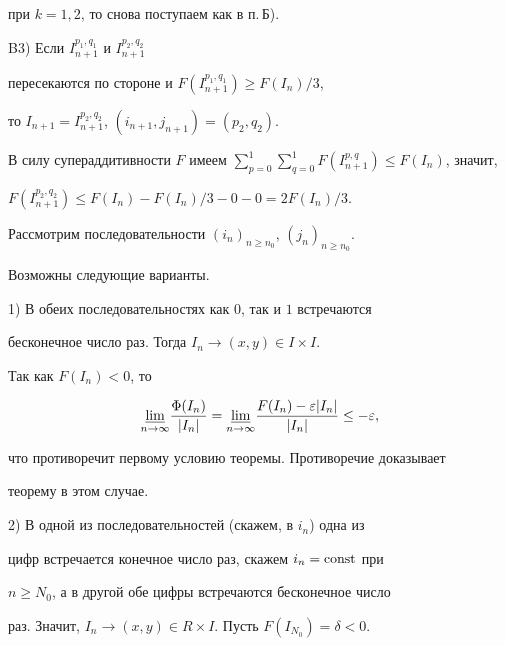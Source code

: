 \begin{pf}
при $k=1,2$, то снова поступаем как в п.\,Б).





B3) Если $I^{p_{1},q_{1}}_{n+1}$ и $I^{p_{2},q_{2}}_{n+1}$


пересекаются по стороне и $F(I^{p_{1},q_{1}}_{n+1})\ge F(I_{n})/3$,


то $I_{n+1}=I^{p_{2},q_{2}}_{n+1}$, $(i_{n+1},j_{n+1})=(p_{2},q_{2})$.


В силу супераддитивности $F$ имеем $\sum\limits _{p=0}^{1}\sum\limits _{q=0}


^{1}F(I^{p,q}_{n+1})\le F(I_{n})$, значит,


$F(I^{p_{2},q_{2}}_{n+1})\leq F(I_{n})


-F(I_{n})/3-0-0=2F(I_{n})/3$.





Рассмотрим последовательности $(i_{n})_{n\ge n_{0}}$, $(j_{n})_{n\ge n_{0}}$.


Возможны следующие варианты.





1) В обеих последовательностях как $0$, так и $1$ встречаются


бесконечное число раз. Тогда $I_{n}\rightarrow (x,y)\in I\times I$.


Так как $F(I_{n})<0$, то 


$$


\underset{n \to \infty}{\varliminf}{}


\frac{\Phi(I_{n})}


{| I_{n}| }=\underset{n \to \infty}{\varliminf}{}


\frac{F(I_{n})-\varepsilon | I_{n}| }{| I_{n}| }\le -\varepsilon ,


$$


что противоречит первому условию теоремы. Противоречие доказывает


теорему в этом случае.





2) В одной из последовательностей (скажем, в $i_{n}$) одна из


цифр встречается конечное число раз, скажем $i_{n}=\operatorname{const}$ при


$n\ge N_{0}$, а в другой обе цифры встречаются бесконечное число


раз. Значит, $I_{n}\to (x,y)\in R\times I$. Пусть $F(I_{N_{0}})=\delta <0$.



\end{pf}
